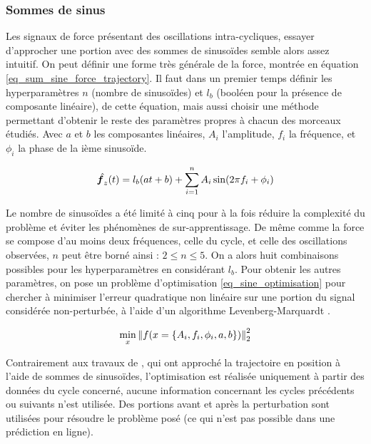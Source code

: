 

\subsubsection{Sommes de sinus} \label{chap3_sec_method_sub_virt_traj_6}

Les signaux de force présentant des oscillations intra-cycliques, essayer d'approcher une portion avec des sommes de sinusoïdes semble alors assez intuitif. On peut définir une forme très générale de la force, montrée en équation \cref{eq_sum_sine_force_trajectory}. Il faut dans un premier temps définir les hyperparamètres $n$ (nombre de sinusoïdes) et $l_b$ (booléen pour la présence de composante linéaire), de cette équation, mais aussi choisir une méthode permettant d'obtenir le reste des paramètres propres à chacun des morceaux étudiés. Avec $a$ et $b$ les composantes linéaires, $A_i$ l'amplitude, $f_i$ la fréquence, et $\phi_i$ la phase de la ième sinusoïde.

\begin{equation} \label{eq_sum_sine_force_trajectory}
	\hat{\vect{f}_z}(t) = l_b(at + b) + \sum_{i=1}^{n}A_i \sin(2\pi f_i + \phi_i)
\end{equation}

Le nombre de sinusoïdes a été limité à cinq pour à la fois réduire la complexité du problème et éviter les phénomènes de sur-apprentissage. De même comme la force se compose d'au moins deux fréquences, celle du cycle, et celle des oscillations observées, $n$ peut être borné ainsi : $2\le n\le5$. On a alors huit combinaisons possibles pour les hyperparamètres en considérant $l_b$. Pour obtenir les autres paramètres, on pose un problème d'optimisation \cref{eq_sine_optimisation} pour chercher à minimiser l'erreur quadratique non linéaire sur une portion du signal considérée non-perturbée, à l'aide d'un algorithme Levenberg-Marquardt \parencite{more_levenberg-marquardt_1978}.

\begin{equation} \label{eq_sine_optimisation}
\min_x \left\lVert f(x=\{A_i, f_i, \phi_i, a, b\})\right\rVert^2_2
\end{equation}

Contrairement aux travaux de \textcite{abe_modulation_2003}, qui ont approché la trajectoire en position à l'aide de sommes de sinusoïdes, l'optimisation est réalisée uniquement à partir des données du cycle concerné, aucune information concernant les cycles précédents ou suivants n'est utilisée. Des portions avant et après la perturbation sont utilisées pour résoudre le problème posé (ce qui n'est pas possible dans une prédiction en ligne). 

